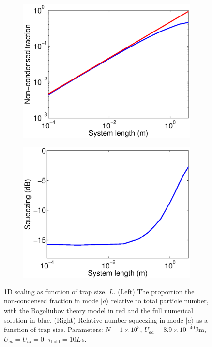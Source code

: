 \documentclass{iopart}
\begin{document}
\begin{figure}
  \centering
  \begin{subfigure}{.48\textwidth}
    \centering
    \includegraphics[width=\textwidth]{figures/1D_Bog_mode_occupation_scaling.eps}
  \end{subfigure}
  \begin{subfigure}{.48\textwidth}
    \centering
    \includegraphics[width=\textwidth]{figures/1D_squeezing_scaling.eps}
  \end{subfigure}
\caption{1D scaling as function of trap size, $L$. (Left) The proportion the non-condensed fraction in mode $|a\rangle$ relative to total particle number, with the Bogoliubov theory model in red and the full numerical solution in blue. (Right) Relative number squeezing in mode $|a\rangle$ as a function of trap size. Parameters: $N=1\times 10^5$, $U_{aa} = 8.9\times 10^{-40}$Jm, $U_{ab}=U_{bb}=0$, $\tau_{\mathrm{hold}} = 10L$\,s.}
  \label{fig1D_squeezing_and_bog_scaling}
\end{figure}
\end{document}
